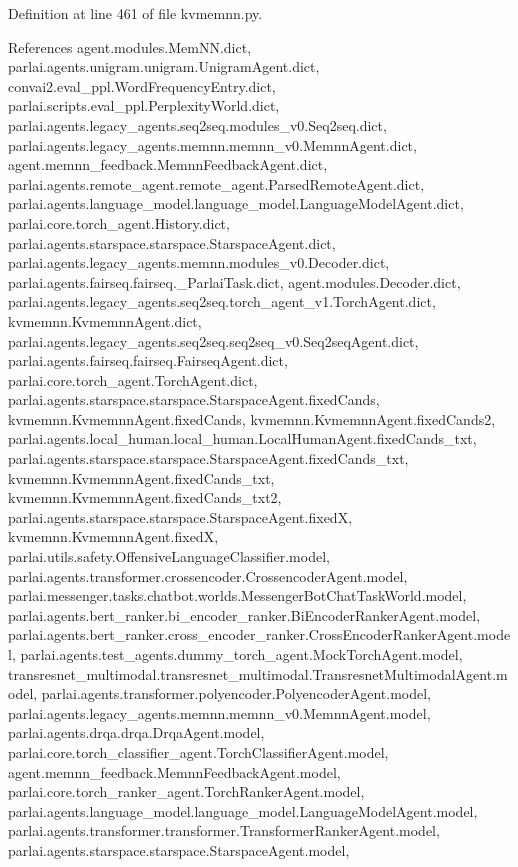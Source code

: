 Definition at line 461 of file kvmemnn.\+py.



References agent.\+modules.\+Mem\+N\+N.\+dict, parlai.\+agents.\+unigram.\+unigram.\+Unigram\+Agent.\+dict, convai2.\+eval\+\_\+ppl.\+Word\+Frequency\+Entry.\+dict, parlai.\+scripts.\+eval\+\_\+ppl.\+Perplexity\+World.\+dict, parlai.\+agents.\+legacy\+\_\+agents.\+seq2seq.\+modules\+\_\+v0.\+Seq2seq.\+dict, parlai.\+agents.\+legacy\+\_\+agents.\+memnn.\+memnn\+\_\+v0.\+Memnn\+Agent.\+dict, agent.\+memnn\+\_\+feedback.\+Memnn\+Feedback\+Agent.\+dict, parlai.\+agents.\+remote\+\_\+agent.\+remote\+\_\+agent.\+Parsed\+Remote\+Agent.\+dict, parlai.\+agents.\+language\+\_\+model.\+language\+\_\+model.\+Language\+Model\+Agent.\+dict, parlai.\+core.\+torch\+\_\+agent.\+History.\+dict, parlai.\+agents.\+starspace.\+starspace.\+Starspace\+Agent.\+dict, parlai.\+agents.\+legacy\+\_\+agents.\+memnn.\+modules\+\_\+v0.\+Decoder.\+dict, parlai.\+agents.\+fairseq.\+fairseq.\+\_\+\+Parlai\+Task.\+dict, agent.\+modules.\+Decoder.\+dict, parlai.\+agents.\+legacy\+\_\+agents.\+seq2seq.\+torch\+\_\+agent\+\_\+v1.\+Torch\+Agent.\+dict, kvmemnn.\+Kvmemnn\+Agent.\+dict, parlai.\+agents.\+legacy\+\_\+agents.\+seq2seq.\+seq2seq\+\_\+v0.\+Seq2seq\+Agent.\+dict, parlai.\+agents.\+fairseq.\+fairseq.\+Fairseq\+Agent.\+dict, parlai.\+core.\+torch\+\_\+agent.\+Torch\+Agent.\+dict, parlai.\+agents.\+starspace.\+starspace.\+Starspace\+Agent.\+fixed\+Cands, kvmemnn.\+Kvmemnn\+Agent.\+fixed\+Cands, kvmemnn.\+Kvmemnn\+Agent.\+fixed\+Cands2, parlai.\+agents.\+local\+\_\+human.\+local\+\_\+human.\+Local\+Human\+Agent.\+fixed\+Cands\+\_\+txt, parlai.\+agents.\+starspace.\+starspace.\+Starspace\+Agent.\+fixed\+Cands\+\_\+txt, kvmemnn.\+Kvmemnn\+Agent.\+fixed\+Cands\+\_\+txt, kvmemnn.\+Kvmemnn\+Agent.\+fixed\+Cands\+\_\+txt2, parlai.\+agents.\+starspace.\+starspace.\+Starspace\+Agent.\+fixedX, kvmemnn.\+Kvmemnn\+Agent.\+fixedX, parlai.\+utils.\+safety.\+Offensive\+Language\+Classifier.\+model, parlai.\+agents.\+transformer.\+crossencoder.\+Crossencoder\+Agent.\+model, parlai.\+messenger.\+tasks.\+chatbot.\+worlds.\+Messenger\+Bot\+Chat\+Task\+World.\+model, parlai.\+agents.\+bert\+\_\+ranker.\+bi\+\_\+encoder\+\_\+ranker.\+Bi\+Encoder\+Ranker\+Agent.\+model, parlai.\+agents.\+bert\+\_\+ranker.\+cross\+\_\+encoder\+\_\+ranker.\+Cross\+Encoder\+Ranker\+Agent.\+model, parlai.\+agents.\+test\+\_\+agents.\+dummy\+\_\+torch\+\_\+agent.\+Mock\+Torch\+Agent.\+model, transresnet\+\_\+multimodal.\+transresnet\+\_\+multimodal.\+Transresnet\+Multimodal\+Agent.\+model, parlai.\+agents.\+transformer.\+polyencoder.\+Polyencoder\+Agent.\+model, parlai.\+agents.\+legacy\+\_\+agents.\+memnn.\+memnn\+\_\+v0.\+Memnn\+Agent.\+model, parlai.\+agents.\+drqa.\+drqa.\+Drqa\+Agent.\+model, parlai.\+core.\+torch\+\_\+classifier\+\_\+agent.\+Torch\+Classifier\+Agent.\+model, agent.\+memnn\+\_\+feedback.\+Memnn\+Feedback\+Agent.\+model, parlai.\+core.\+torch\+\_\+ranker\+\_\+agent.\+Torch\+Ranker\+Agent.\+model, parlai.\+agents.\+language\+\_\+model.\+language\+\_\+model.\+Language\+Model\+Agent.\+model, parlai.\+agents.\+transformer.\+transformer.\+Transformer\+Ranker\+Agent.\+model, parlai.\+agents.\+starspace.\+starspace.\+Starspace\+Agent.\+model, 